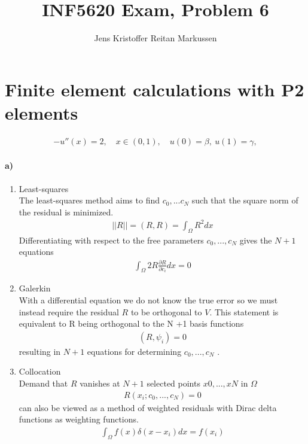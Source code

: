 \documentclass[11pt,a4paper]{article}
\author{Jens Kristoffer Reitan Markussen}
\title{INF5620 Exam, Problem 6}
\begin{document}
\maketitle
\section*{Finite element calculations with P2 elements}
\begin{align}
-u''(x) = 2,\quad x\in (0,1),\quad u(0)=\beta,\ u(1)=\gamma,
\end{align}
\paragraph*{a)}
\begin{enumerate}
\item Least-squares\\
The least-squares method aims to find $c_0,...c_N$ such that the square norm of the residual is minimized.
\begin{align}
||R||=(R,R)= \int_\Omega R^2dx
\end{align}
Differentiating with respect to the free parameters $c_0,...,c_N$ gives the $N + 1$ equations
\begin{align*}
\int_\Omega 2R\frac{\partial R}{\partial c_i}dx = 0
\end{align*}
\item Galerkin\\
With a differential equation we do not know the true error so we must instead require the residual $R$ to be orthogonal to $V$. This statement is equivalent to R being orthogonal to the N +1 basis functions
\begin{align*}
(R,\psi_i) =0
\end{align*}
resulting in $N + 1$ equations for determining $c_0,...,c_N$ .
\item Collocation \\
Demand that $R$ vanishes at $N + 1$ selected points $x0,...,xN$ in $\Omega$
\begin{align*}
R(x_i;c_0,...,c_N) = 0
\end{align*}
can also be viewed as a method of weighted residuals with Dirac delta functions as weighting functions.
\begin{align*}
\int_\Omega f(x)\delta(x-x_i)dx = f(x_i)
\end{align*}
\end{enumerate}
\end{document}
